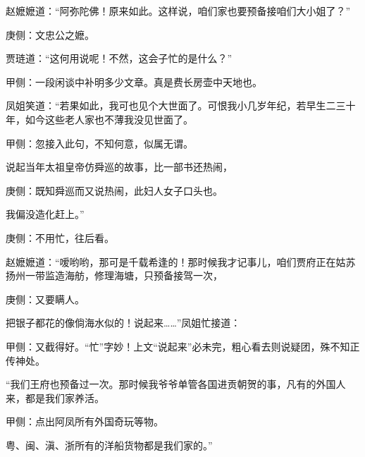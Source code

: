 \begin{parag}
    赵嬷嬷道：“阿弥陀佛！原来如此。这样说，咱们家也要预备接咱们大小姐了？”\begin{note}庚侧：文忠公之嬷。\end{note}贾琏道：“这何用说呢！不然，这会子忙的是什么？”\begin{note}甲侧：一段闲谈中补明多少文章。真是费长房壶中天地也。\end{note}凤姐笑道：“若果如此，我可也见个大世面了。可恨我小几岁年纪，若早生二三十年，如今这些老人家也不薄我没见世面了。\begin{note}甲侧：忽接入此句，不知何意，似属无谓。\end{note}说起当年太祖皇帝仿舜巡的故事，比一部书还热闹，\begin{note}庚侧：既知舜巡而又说热闹，此妇人女子口头也。\end{note}我偏没造化赶上。”\begin{note}庚侧：不用忙，往后看。\end{note}赵嬷嬷道：“嗳哟哟，那可是千载希逢的！那时候我才记事儿，咱们贾府正在姑苏扬州一带监造海舫，修理海塘，只预备接驾一次，\begin{note}庚侧：又要瞒人。\end{note}把银子都花的像倘海水似的！说起来……”凤姐忙接道：\begin{note}甲侧：又截得好。“忙”字妙！上文“说起来”必未完，粗心看去则说疑团，殊不知正传神处。\end{note}“我们王府也预备过一次。那时候我爷爷单管各国进贡朝贺的事，凡有的外国人来，都是我们家养活。\begin{note}甲侧：点出阿凤所有外国奇玩等物。\end{note}粤、闽、滇、浙所有的洋船货物都是我们家的。”
\end{parag}


